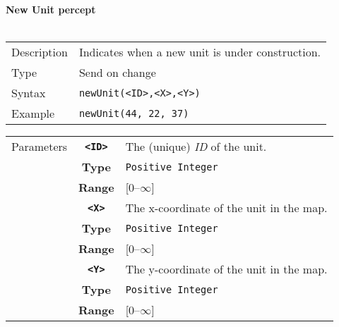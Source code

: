 \noindent
\textbf{New Unit percept}\\
\\
\begin{tabularx}{\textwidth}{lX}
 Description & Indicates when a new unit is under construction. \\
 Type & Send on change \\
 Syntax & \verb|newUnit(<ID>,<X>,<Y>)| \\
 Example & \verb|newUnit(44, 22, 37)|   \\
 \end{tabularx}
 \begin{tabularx}{\textwidth}{l | c | p{8cm}|}
 \cline{2-3}
 Parameters & \textbf{\verb|<ID>|} & The (unique) \textit{ID} of the unit.\\
            & \textbf{Type} & \verb|Positive Integer| \\
            & \textbf{Range} & [0--$\infty$] \\
            \cline{2-3}
            & \textbf{\verb|<X>|} & The x-coordinate of the unit in the map. \\
            & \textbf{Type} & \verb|Positive Integer| \\
            &\textbf{Range} &  [0--$\infty$] \\
            \cline{2-3}
            & \textbf{\verb|<Y>|} & The y-coordinate of the unit in the map. \\
            & \textbf{Type} & \verb|Positive Integer| \\
            &\textbf{Range} & [0--$\infty$] \\
            \cline{2-3}
\end{tabularx}

